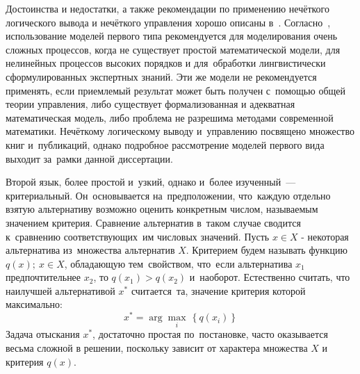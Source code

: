 Достоинства и недостатки, а также рекомендации по применению нечёткого логического вывода и нечёткого управления хорошо описаны в~\cite{Bauer_Winkler}. Согласно~\cite{Bauer_Winkler}, использование моделей первого типа рекомендуется для моделирования очень сложных процессов, когда не существует простой математической модели, для нелинейных процессов высоких порядков и для~обработки лингвистически сформулированных экспертных знаний. Эти же модели не рекомендуется применять, если приемлемый результат может быть получен с~помощью общей теории управления, либо существует формализованная и адекватная математическая модель, либо проблема не разрешима методами современной математики. Нечёткому логическому выводу и~управлению посвящено множество книг и~публикаций, однако подробное рассмотрение моделей первого вида выходит за~рамки данной диссертации.

Второй язык, более простой и~узкий, однако и~более изученный~--- критериальный. Он~основывается на~предположении, что~каждую отдельно взятую альтернативу возможно оценить конкретным числом, называемым значением критерия. Сравнение альтернатив в~таком случае сводится к~сравнению соответствующих~им числовых значений. Пусть $x\in X$ - некоторая альтернатива из~множества альтернатив $X$. Критерием будем называть функцию $q\left( x \right);\ x\in X$, обладающую тем~свойством, что~если альтернатива ${x_1}$ предпочтительнее ${x_2}$, то $q\left( x_1 \right)>q\left( x_2 \right)$ и~наоборот. Естественно считать, что наилучшей альтернативой ${{x}^{*}}$ считается~та, значение критерия которой максимально:
\begin{equation*}
  x^{*}=\arg \underset{i}{\mathop{\max }}\,\left\{ q\left( x_i \right) \right\}
\end{equation*}
Задача отыскания $x^{*}$, достаточно простая по~постановке, часто оказывается весьма сложной в решении, поскольку зависит от характера множества $X$ и критерия $q\left( x \right)$. 


